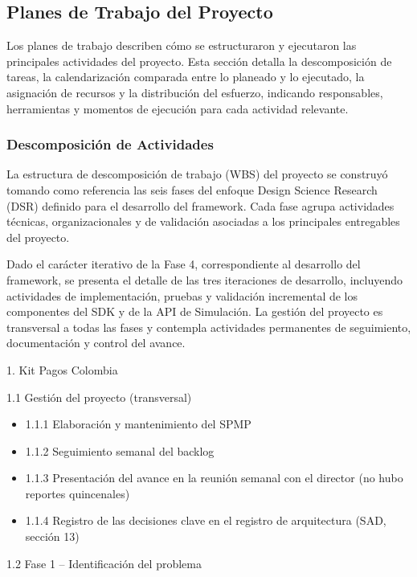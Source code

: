 \subsection{Planes de Trabajo del Proyecto}

Los planes de trabajo describen cómo se estructuraron y ejecutaron las principales actividades del proyecto. Esta sección detalla la descomposición de tareas, la calendarización comparada entre lo planeado y lo ejecutado, la asignación de recursos y la distribución del esfuerzo, indicando responsables, herramientas y momentos de ejecución para cada actividad relevante.

\subsubsection{Descomposición de Actividades}

La estructura de descomposición de trabajo (WBS) del proyecto se construyó tomando como referencia las seis fases del enfoque Design Science Research (DSR) definido para el desarrollo del framework. Cada fase agrupa actividades técnicas, organizacionales y de validación asociadas a los principales entregables del proyecto.

Dado el carácter iterativo de la Fase 4, correspondiente al desarrollo del framework, se presenta el detalle de las tres iteraciones de desarrollo, incluyendo actividades de implementación, pruebas y validación incremental de los componentes del SDK y de la API de Simulación. La gestión del proyecto es transversal a todas las fases y contempla actividades permanentes de seguimiento, documentación y control del avance.

1. Kit Pagos Colombia

1.1 Gestión del proyecto (transversal)

\begin{itemize}
  \item 1.1.1 Elaboración y mantenimiento del SPMP
  \item 1.1.2 Seguimiento semanal del backlog
  \item 1.1.3 Presentación del avance en la reunión semanal con el director (no hubo reportes quincenales)
  \item 1.1.4 Registro de las decisiones clave en el registro de arquitectura (SAD, sección 13)
\end{itemize}

1.2 Fase 1 – Identificación del problema

